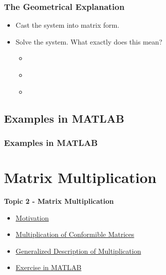 \documentclass[fleqn]{beamer} %
\newcommand{\sectionIItitle}{Matrix Multiplication}
\newcommand{\sectionIsubsectionIIItitle}{The Geometrical Explanation}
\newcommand{\sectionIsubsectionIVtitle}{Examples in MATLAB}
\newcommand{\sectionIIsubsectionItitle}{Motivation}
\newcommand{\sectionIIsubsectionIItitle}{Multiplication of Conformible Matrices}
\newcommand{\sectionIIsubsectionIIItitle}{Generalized Description of Multiplication}
\newcommand{\sectionIIsubsectionIVtitle}{Exercise in MATLAB}
\begin{document}
			\begin{frame} 
				\frametitle{\sectionIsubsectionIIItitle}
				\bigskip
	
				\begin{itemize}
		
					\item Cast the system into matrix form. \vspace{10mm}
			
					\item Solve the system. What exactly does this mean?\\
					\begin{itemize}
						\item \hspace{10mm} \\
						\item \hspace{10mm} \\
						\item \hspace{10mm} \\
					\end{itemize}
		
				\end{itemize}
			
				\btVFill
			\end{frame}	



		\subsection{\sectionIsubsectionIVtitle}\label{sectionIsubsectionIV}	

			\begin{frame}
				\frametitle{\sectionIsubsectionIVtitle}
				\bigskip


				\btVFill
			\end{frame}
	
	\section{\sectionIItitle}\label{sectionII}

		\begin{frame}
			\large \textbf{Topic 2 - \sectionIItitle} \vspace{3mm}\\

			\begin{itemize}
				\item \hyperlink{sectionIIsubsectionI}{\sectionIIsubsectionItitle} \vspc %
				\item \hyperlink{sectionIIsubsectionII}{\sectionIIsubsectionIItitle} \vspc %
				\item \hyperlink{sectionIIsubsectionIII}{\sectionIIsubsectionIIItitle} \vspc %
				\item \hyperlink{sectionIIsubsectionIV}{\sectionIIsubsectionIVtitle} \vspc %
			\end{itemize}

		\end{frame}
\end{document}
